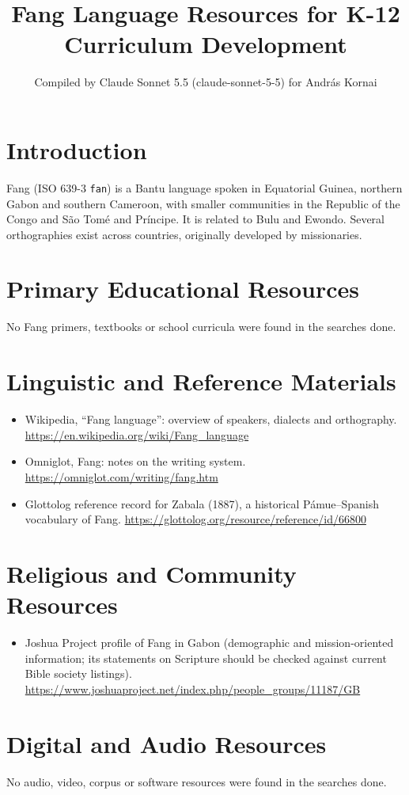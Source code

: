 \documentclass[12pt]{article}
\title{Fang Language Resources for K-12 Curriculum Development}
\author{Compiled by Claude Sonnet 5.5 (claude-sonnet-5-5) for Andr\'as Kornai}
\date{}
\begin{document}
\maketitle

\section{Introduction}
Fang (ISO 639-3 \texttt{fan}) is a Bantu language spoken in Equatorial Guinea, northern Gabon and southern Cameroon, with smaller communities in the Republic of the Congo and S\~ao Tom\'e and Pr\'incipe. It is related to Bulu and Ewondo. Several orthographies exist across countries, originally developed by missionaries.

\section{Primary Educational Resources}
No Fang primers, textbooks or school curricula were found in the searches done.

\section{Linguistic and Reference Materials}
\begin{itemize}
\item Wikipedia, ``Fang language'': overview of speakers, dialects and orthography. \url{https://en.wikipedia.org/wiki/Fang_language}
\item Omniglot, Fang: notes on the writing system. \url{https://omniglot.com/writing/fang.htm}
\item Glottolog reference record for Zabala (1887), a historical Pámue--Spanish vocabulary of Fang. \url{https://glottolog.org/resource/reference/id/66800}
\end{itemize}

\section{Religious and Community Resources}
\begin{itemize}
\item Joshua Project profile of Fang in Gabon (demographic and mission-oriented information; its statements on Scripture should be checked against current Bible society listings). \url{https://www.joshuaproject.net/index.php/people_groups/11187/GB}
\end{itemize}

\section{Digital and Audio Resources}
No audio, video, corpus or software resources were found in the searches done.
\end{document}
